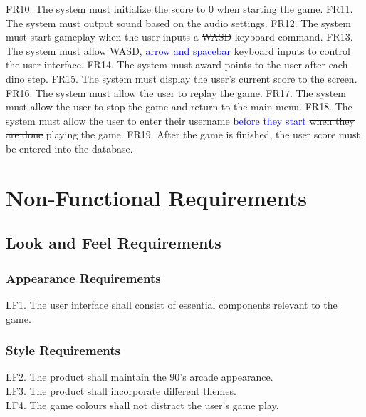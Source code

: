 \documentclass[12pt]{article}
\begin{document}
	FR10. The system must initialize the score to 0 when starting the game. \newline
	FR11. The system must output sound based on the audio settings. \newline
	FR12. The system must start gameplay when the user inputs a \sout{WASD} keyboard command. \newline
	FR13. The system must allow WASD, \textcolor{blue}{arrow and spacebar} keyboard inputs to control the user interface.\newline
	FR14. The system must award points to the user after each dino step. \newline
	FR15. The system must display the user’s current score to the screen. \newline
	FR16. The system must allow the user to replay the game. \newline
	FR17. The system must allow the user to stop the game and return to the main menu. \newline
	FR18. The system must allow the user to enter their username \textcolor{blue}{before they start} \sout{when they are done} playing the game. \newline
	FR19. After the game is finished, the user score must be entered into the database. \newline
	
	
	
	\section{Non-Functional Requirements}
	\subsection{Look and Feel Requirements}
	\subsubsection{Appearance Requirements}
	LF1. The user interface shall consist of essential components relevant to the game.
	\subsubsection{Style Requirements} 
	LF2. The product shall maintain the 90's arcade appearance.\\
	LF3. The product shall incorporate different themes.\\
	LF4. The game colours shall not distract the user's game play.
	
\end{document}

